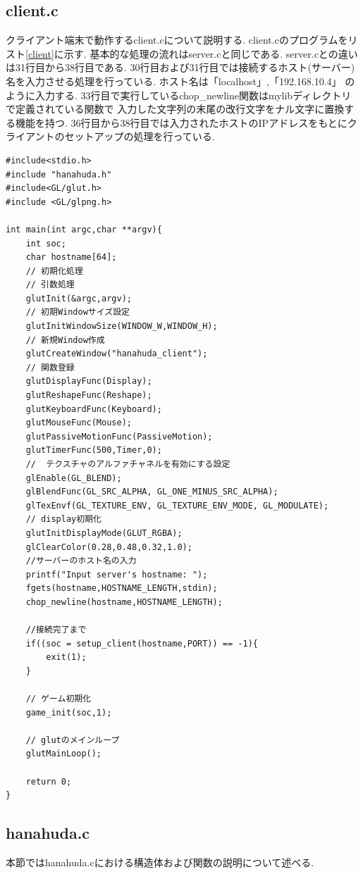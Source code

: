 \documentclass[a4j]{jarticle}
\begin{document}
    \subsection{client.c}
    クライアント端末で動作するclient.cについて説明する. client.cのプログラムをリスト\ref{client}に示す. 基本的な処理の流れはserver.cと同じである. 
    server.cとの違いは31行目から38行目である. 30行目および31行目では接続するホスト(サーバー)名を入力させる処理を行っている. ホスト名は「localhost」,「192.168.10.4」
    のように入力する. 33行目で実行しているchop\_newline関数はmylibディレクトリで定義されている関数で
    入力した文字列の末尾の改行文字をナル文字に置換する機能を持つ. 36行目から38行目では入力されたホストのIPアドレスをもとにクライアントのセットアップの処理を行っている.
    \begin{lstlisting}[basicstyle=\ttfamily\footnotesize, frame=single,label=client,caption=client.c]
#include<stdio.h>
#include "hanahuda.h"
#include<GL/glut.h>
#include <GL/glpng.h>

int main(int argc,char **argv){
    int soc;
    char hostname[64];
    // 初期化処理
    // 引数処理
    glutInit(&argc,argv);
    // 初期Windowサイズ設定
    glutInitWindowSize(WINDOW_W,WINDOW_H);
    // 新規Window作成
    glutCreateWindow("hanahuda_client");
    // 関数登録
    glutDisplayFunc(Display);
    glutReshapeFunc(Reshape);
    glutKeyboardFunc(Keyboard);
    glutMouseFunc(Mouse);
    glutPassiveMotionFunc(PassiveMotion);
    glutTimerFunc(500,Timer,0);
    //  テクスチャのアルファチャネルを有効にする設定
    glEnable(GL_BLEND);
    glBlendFunc(GL_SRC_ALPHA, GL_ONE_MINUS_SRC_ALPHA);
    glTexEnvf(GL_TEXTURE_ENV, GL_TEXTURE_ENV_MODE, GL_MODULATE);
    // display初期化
    glutInitDisplayMode(GLUT_RGBA);
    glClearColor(0.28,0.48,0.32,1.0);
    //サーバーのホスト名の入力
    printf("Input server's hostname: ");
    fgets(hostname,HOSTNAME_LENGTH,stdin);
    chop_newline(hostname,HOSTNAME_LENGTH);

    //接続完了まで
    if((soc = setup_client(hostname,PORT)) == -1){
        exit(1);
    }

    // ゲーム初期化
    game_init(soc,1);
    
    // glutのメインループ
    glutMainLoop();

    return 0;
}
          \end{lstlisting}

    \subsection{hanahuda.c}
    本節ではhanahuda.cにおける構造体および関数の説明について述べる.
\end{document}
